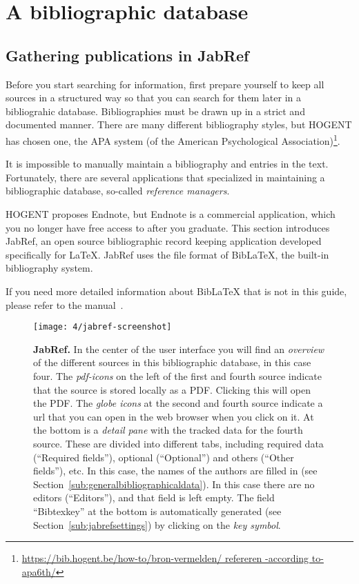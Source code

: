 \chapter{A bibliographic database}
\label{ch:bibliography}

\section{Gathering publications in JabRef}
\label{sec:publicationsjabref}

Before you start searching for information, first prepare yourself to keep all sources in a structured way so that you can search for them later in a bibliograhic database. Bibliographies must be drawn up in a strict and documented manner. There are many different bibliography styles, but HOGENT has chosen one, the APA system (of the American Psychological Association)\footnote{\url{https://bib.hogent.be/how-to/bron-vermelden/ refereren -according to-apa6th/}}.

It is impossible to manually maintain a bibliography and entries in the text. Fortunately, there are several applications that specialized in maintaining a bibliographic database, so-called \emph{reference managers}.

HOGENT proposes Endnote, but Endnote is a commercial application, which you no longer have free access to after you graduate. This section introduces JabRef, an open source bibliographic record keeping application developed specifically for {\LaTeX}. JabRef uses the file format of Bib{\LaTeX}, the built-in bibliography system.

If you need more detailed information about Bib{\LaTeX} that is not in this guide, please refer to the manual~\autocite{LehmanEtAl2016}.

\begin{figure}
  \centering
  \texttt{[image: 4/jabref-screenshot]}
  \caption[JabRef]{\textbf{JabRef.} In the center of the user interface you will find an \emph{overview} of the different sources in this bibliographic database, in this case four. The \emph{pdf-icons} on the left of the first and fourth source indicate that the source is stored locally as a PDF. Clicking this will open the PDF. The \emph{globe icons} at the second and fourth source indicate a url that you can open in the web browser when you click on it. At the bottom is a \emph{detail pane} with the tracked data for the fourth source. These are divided into different tabs, including required data (``Required fields''), optional (``Optional'') and others (``Other fields''), etc. In this case, the names of the authors are filled in (see Section~\ref{sub:generalbibliographicaldata}). In this case there are no editors (``Editors''), and that field is left empty. The field ``Bibtexkey'' at the bottom is automatically generated (see Section~\ref{sub:jabrefsettings}) by clicking on the \emph{key symbol}.}
  \label{fig:jabref}
\end{figure}


